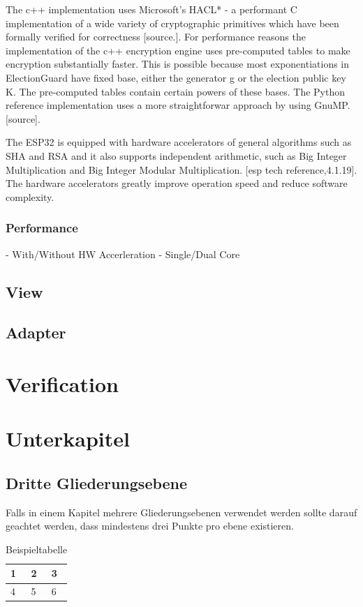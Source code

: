 The c++ implementation uses Microsoft's HACL* - a performant C implementation of a wide variety of cryptographic primitives which have been formally verified for correctness [source.]. For performance reasons the implementation of the c++ encryption engine  uses pre-computed tables to make encryption substantially faster. This is possible because most exponentiations in ElectionGuard have fixed base, either the generator g or the election public key K. The pre-computed tables contain certain powers of these bases. The Python reference implementation uses a more straightforwar approach by using GnuMP. [source].

The ESP32 is equipped with hardware accelerators of general algorithms such as SHA and RSA and it also supports independent arithmetic, such as Big Integer Multiplication and Big Integer Modular Multiplication. [esp tech reference,4.1.19]. The hardware accelerators greatly improve operation speed and reduce software complexity. 

\subsubsection{Performance}
- With/Without HW Accerleration
- Single/Dual Core
\subsection{View}
\subsection{Adapter}

\section{Verification}



\section{Unterkapitel}
\subsection{Dritte Gliederungsebene}
Falls in einem Kapitel mehrere Gliederungsebenen verwendet werden sollte darauf geachtet werden, dass mindestens drei Punkte pro ebene existieren. 

\begin{table}[h]
	\centering
	\begin{tabular}{|l|l|l|}
		\hline
		1&2&3\\\hline
		4&5&6\\\hline
	\end{tabular}
	\caption{Beispieltabelle}
	\label{Tab:Beispieltabelle}
\end{table}

